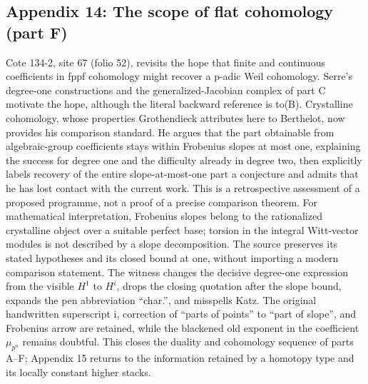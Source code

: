 \subsection*{Appendix 14: The scope of flat cohomology (part F)}
Cote 134-2, site 67 (folio 52), revisits the hope that finite and continuous coefficients in fppf cohomology might recover a p-adic Weil cohomology. Serre's degree-one constructions and the generalized-Jacobian complex of part C motivate the hope, although the literal backward reference is to(B). Crystalline cohomology, whose properties Grothendieck attributes here to Berthelot, now provides his comparison standard. He argues that the part obtainable from algebraic-group coefficients stays within Frobenius slopes at most one, explaining the success for degree one and the difficulty already in degree two, then explicitly labels recovery of the entire slope-at-most-one part a conjecture and admits that he has lost contact with the current work. This is a retrospective assessment of a proposed programme, not a proof of a precise comparison theorem. For mathematical interpretation, Frobenius slopes belong to the rationalized crystalline object over a suitable perfect base; torsion in the integral Witt-vector modules is not described by a slope decomposition. The source preserves its stated hypotheses and its closed bound at one, without importing a modern comparison statement. The witness changes the decisive degree-one expression from the visible $H^1$ to $H^i$, drops the closing quotation after the slope bound, expands the pen abbreviation ``char.'', and misspells Katz. The original handwritten superscript i, correction of ``parts of points'' to ``part of slope'', and Frobenius arrow are retained, while the blackened old exponent in the coefficient $\mu_{p^n}$ remains doubtful. This closes the duality and cohomology sequence of parts A--F; Appendix 15 returns to the information retained by a homotopy type and its locally constant higher stacks.


